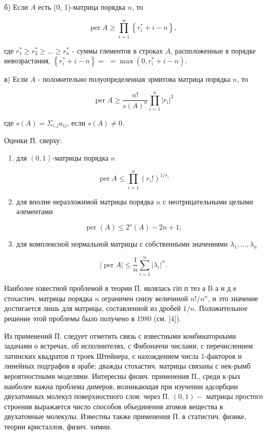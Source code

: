 \documentclass[10pt]{article}
\begin{document}
б) Если $A$ есть (0, 1)-матрица порядка $n$, то

\[
\operatorname{per} A \geqslant \prod_{i=1}^{n}\left\{r_{i}^{*}+i-n\right\} \text {, }
\]

где $r_{1}^{*} \geqslant r_{2}^{*} \geqslant \ldots \geqslant r_{n}^{*}$ - суммы глементов в строках $A$, расположенные в порядке невозрастания, $\left\{r_{i}^{*}+i-n\right\}=$ $=\max \left(0, r_{i}^{*}+i-n\right)$.

в) Если $A$ - положительно полуопределенная эрмитова матрица порядка $n$, то

\[
\operatorname{per} A \geqslant \frac{n !}{s(A)^{n}} \prod_{i=1}^{n}\left|r_{i}\right|^{2}
\]

где $s(A)=\Sigma_{i, j} a_{i j}$, если $s(A) \neq 0$.

Оценки П. сверху:

\begin{enumerate}
  \item для $(0,1)$-матрицы порядка $n$
\end{enumerate}

\[
\operatorname{per} A \leqslant \prod_{i=1}^{n}\left(r_{i} !\right)^{1 / r_{i}}
\]

\begin{enumerate}
  \setcounter{enumi}{1}
  \item для вполне неразложимой матрицы порядка $n$ с неотрицательными целыми әлементами
\end{enumerate}

\[
\operatorname{per}(A) \leqslant 2^{s}(A)-2 n+1 ;
\]

\begin{enumerate}
  \setcounter{enumi}{2}
  \item для комплексной нормальной матрицы с собственными значениями $\lambda_{1}, \ldots, \lambda_{n}$
\end{enumerate}

\[
|\operatorname{per} A| \leqslant \frac{1}{n} \sum_{i=1}^{n}\left|\lambda_{i}\right|^{n} .
\]

Наиболее известной проблемой в теории П. являлась гіп п тез а B а н д е стохастич. матрицы порядка $n$ ограничен снизу величиной $n ! / n^{n}$, и это значение достигается лишь для матрицы, составленной из дробей $1 / n$. Положительное решение этой проблемы было получено в 1980 (см. [4]).

Из применений П. следует отметить связь с известными комбинаторными задачами о встречах, об исполнителях, с Фибоначчи числами, с перечислением латинских квадратов п троек Штейнера, с нахождением числа 1-факторов и линейных подграфов в әрабе; дважды стохастич. матрицы связаны с нек-рымб вероятностными моделями. Интересны физич. применения П., среди к-рых наиболее важна проблема димеров, возникающая при изучении адсорбции двухатомных молекул поверхностного слоя: через П. $(0,1)-$ матрицы простого строения выражается число способов объединения атомов вещества в двухатомные молекулы. Известны также применения П. в статистич. физике, теории кристаллов, физич. химии.
\end{document}
